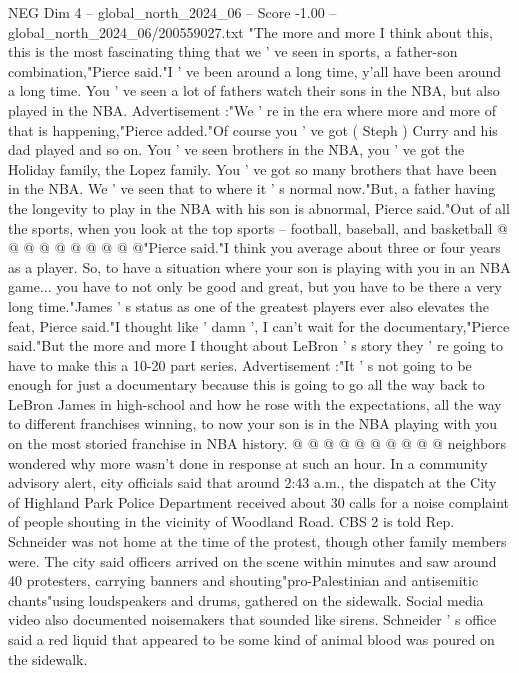 \begin{textsample}{NEG Dim 4 – global\_north\_2024\_06 – Score -1.00 – global\_north\_2024\_06/200559027.txt}  \label{ex:f4_neg_321}
"The more and more I think about this, this is the most fascinating thing that we ' ve seen in sports, a father-son combination,"Pierce said."I ' ve been around a long time, y'all have been around a long time.
You ' ve seen a lot of fathers watch their sons in the NBA, but also played in the NBA.
Advertisement :"We ' re in the era where more and more of that is happening,"Pierce added."Of course you ' ve got ( Steph ) Curry and his dad played and so on.
You ' ve seen brothers in the NBA, you ' ve got the Holiday family, the Lopez family.
You ' ve got so many brothers that have been in the NBA.
We ' ve seen that to where it ' s normal now."But, a father having the longevity to play in the NBA with his son is abnormal, Pierce said."Out of all the sports, when you look at the top sports -- football, baseball, and basketball @ @ @ @ @ @ @ @ @ @"Pierce said."I think you average about three or four years as a player.
So, to have a situation where your son is playing with you in an NBA game... you have to not only be good and great, but you have to be there a very long time."James ' s status as one of the greatest players ever also elevates the feat, Pierce said."I thought like ' damn ', I can't wait for the documentary,"Pierce said."But the more and more I thought about LeBron ' s story they ' re going to have to make this a 10-20 part series.
Advertisement :"It ' s not going to be enough for just a documentary because this is going to go all the way back to LeBron James in high-school and how he rose with the expectations, all the way to different franchises winning, to now your son is in the NBA playing with you on the most storied franchise in NBA history. @ @ @ @ @ @ @ @ @ @ neighbors wondered why more wasn't done in response at such an hour.
In a community advisory alert, city officials said that around 2:43 a.m., the dispatch at the City of Highland Park Police Department received about 30 calls for a noise complaint of people shouting in the vicinity of Woodland Road.
CBS 2 is told Rep.
Schneider was not home at the time of the protest, though other family members were.
The city said officers arrived on the scene within minutes and saw around 40 protesters, carrying banners and shouting"pro-Palestinian and antisemitic chants"using loudspeakers and drums, gathered on the sidewalk.
Social media video also documented noisemakers that sounded like sirens.
Schneider ' s office said a red liquid that appeared to be some kind of animal blood was poured on the sidewalk.

\end{textsample}
